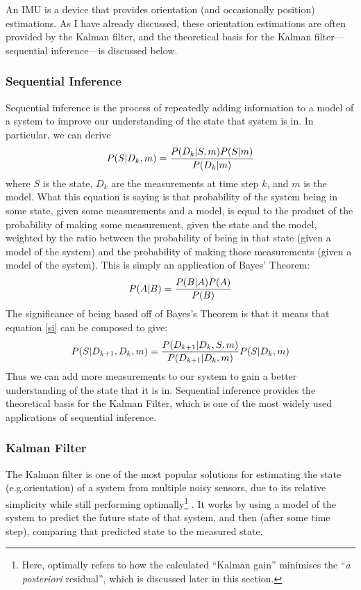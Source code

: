 \documentclass[12pt]{article}
\begin{document}
An IMU is a device that provides orientation (and occasionally position) estimations. As I have already discussed, these orientation estimations are often provided by the Kalman filter, and the theoretical basis for the Kalman filter---sequential inference---is discussed below.

\subsubsection{Sequential Inference}

Sequential inference \cite{morrison_2016} is the process of repeatedly adding information to a model of a system to improve our understanding of the state that system is in. In particular, we can derive
\begin{equation}
	\label{si}
	P(S | D_k, m) = {P(D_k | S, m) P(S | m) \over P(D_k | m)}
\end{equation}
where $S$ is the state, $D_k$ are the measurements at time step $k$, and $m$ is the model. What this equation is saying is that probability of the system being in some state, given some measurements and a model, is equal to the product of the probability of making some measurement, given the state and the model, weighted by the ratio between the probability of being in that state (given a model of the system) and the probability of making those measurements (given a model of the system). This is simply an application of Bayes' Theorem:
\begin{equation}
	P(A | B) = {P(B|A) P(A) \over P(B)}
\end{equation}
The significance of being based off of Bayes's Theorem is that it means that equation \ref{si} can be composed to give:
\begin{equation}
	P(S|D_{k+1},D_k,m) = {P(D_{k+1}|D_k,S,m) \over P(D_{k+1}|D_k,m)} P(S | D_k, m)
\end{equation}
Thus we can add more measurements to our system to gain a better understanding of the state that it is in. Sequential inference provides the theoretical basis for the Kalman Filter, which is one of the most widely used applications of sequential inference.

\subsubsection{Kalman Filter}

The Kalman filter \cite{kalman_1960} is one of the most popular solutions for estimating the state (e.g.\@ orientation) of a system from multiple noisy sensors, due to its relative simplicity while still performing optimally\footnote{Here, optimally refers to how the calculated ``Kalman gain'' minimises the ``\emph{a posteriori} residual'', which is discussed later in this section.} \cite{wangyan_2015}. It works by using a model of the system to predict the future state of that system, and then (after some time step), comparing that predicted state to the measured state.
\end{document}

